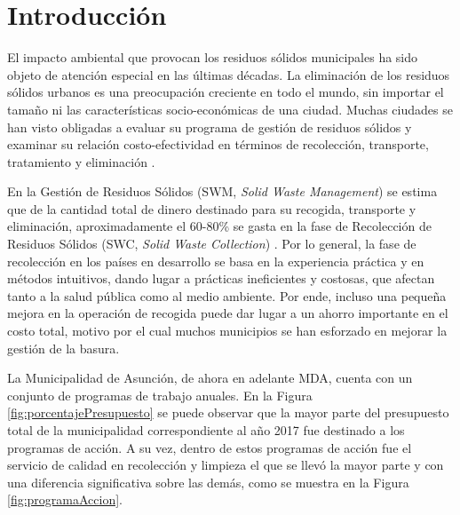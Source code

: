 \chapter{Introducción}
\label{chap1}
\ifpdf
  \graphicspath{{Chapter1/Chapter1Figs/PNG/}{Chapter1/Chapter1Figs/PDF/}{Chapter1/Chapter1Figs/}}
\else
  \graphicspath{{Chapter1/Chapter1Figs/EPS/}{Chapter1/Chapter1Figs/}}
\fi


El impacto ambiental que provocan los residuos sólidos municipales ha sido objeto de atención especial en las últimas décadas. La eliminación de los residuos sólidos urbanos es una preocupación creciente en todo el mundo, sin importar el tamaño ni las características socio-económicas de una ciudad. Muchas ciudades se han visto obligadas a evaluar su programa de gestión de residuos sólidos y examinar su relación costo-efectividad en términos de recolección, transporte, tratamiento y eliminación \citep{Karadimas2007OptimalAlgorithm}.

En la Gestión de Residuos Sólidos (SWM, \textit{Solid Waste Management}) se estima que de la cantidad total de dinero destinado para su recogida, transporte y eliminación, aproximadamente el 60-80\% se gasta en la fase de Recolección de Residuos Sólidos (SWC, \textit{Solid Waste Collection}) \citep{Tavares2009OptimisationModelling,Dogan2003Report:Istanbul}. Por lo general, la fase de recolección en los países en desarrollo se basa en la experiencia práctica y en métodos intuitivos, dando lugar a prácticas ineficientes y costosas, que afectan tanto a la salud pública como al medio ambiente. Por ende, incluso una pequeña mejora en la operación de recogida puede dar lugar a un ahorro importante en el costo total, motivo por el cual muchos municipios se han esforzado en mejorar la gestión de la basura.

La Municipalidad de Asunción, de ahora en adelante MDA, cuenta con un conjunto de programas de trabajo anuales. En la Figura \ref{fig:porcentajePresupuesto} se puede observar que la mayor parte del presupuesto total de la municipalidad correspondiente al año 2017 fue destinado a los programas de acción. A su vez, dentro de estos programas de acción fue el servicio de calidad en recolección y limpieza el que se llevó la mayor parte y con una diferencia significativa sobre las demás, como se muestra en la Figura \ref{fig:programaAccion}.

